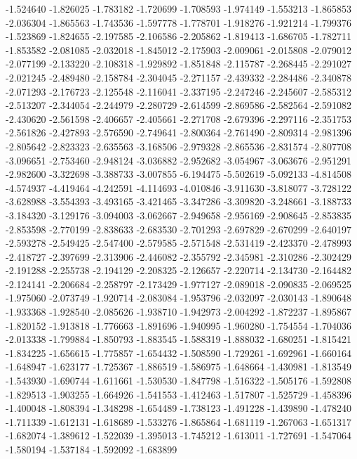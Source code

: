 -1.524640
-1.826025
-1.783182
-1.720699
-1.708593
-1.974149
-1.553213
-1.865853
-2.036304
-1.865563
-1.743536
-1.597778
-1.778701
-1.918276
-1.921214
-1.799376
-1.523869
-1.824655
-2.197585
-2.106586
-2.205862
-1.819413
-1.686705
-1.782711
-1.853582
-2.081085
-2.032018
-1.845012
-2.175903
-2.009061
-2.015808
-2.079012
-2.077199
-2.133220
-2.108318
-1.929892
-1.851848
-2.115787
-2.268445
-2.291027
-2.021245
-2.489480
-2.158784
-2.304045
-2.271157
-2.439332
-2.284486
-2.340878
-2.071293
-2.176723
-2.125548
-2.116041
-2.337195
-2.247246
-2.245607
-2.585312
-2.513207
-2.344054
-2.244979
-2.280729
-2.614599
-2.869586
-2.582564
-2.591082
-2.430620
-2.561598
-2.406657
-2.405661
-2.271708
-2.679396
-2.297116
-2.351753
-2.561826
-2.427893
-2.576590
-2.749641
-2.800364
-2.761490
-2.809314
-2.981396
-2.805642
-2.823323
-2.635563
-3.168506
-2.979328
-2.865536
-2.831574
-2.807708
-3.096651
-2.753460
-2.948124
-3.036882
-2.952682
-3.054967
-3.063676
-2.951291
-2.982600
-3.322698
-3.388733
-3.007855
-6.194475
-5.502619
-5.092133
-4.814508
-4.574937
-4.419464
-4.242591
-4.114693
-4.010846
-3.911630
-3.818077
-3.728122
-3.628988
-3.554393
-3.493165
-3.421465
-3.347286
-3.309820
-3.248661
-3.188733
-3.184320
-3.129176
-3.094003
-3.062667
-2.949658
-2.956169
-2.908645
-2.853835
-2.853598
-2.770199
-2.838633
-2.683530
-2.701293
-2.697829
-2.670299
-2.640197
-2.593278
-2.549425
-2.547400
-2.579585
-2.571548
-2.531419
-2.423370
-2.478993
-2.418727
-2.397699
-2.313906
-2.446082
-2.355792
-2.345981
-2.310286
-2.302429
-2.191288
-2.255738
-2.194129
-2.208325
-2.126657
-2.220714
-2.134730
-2.164482
-2.124141
-2.206684
-2.258797
-2.173429
-1.977127
-2.089018
-2.090835
-2.069525
-1.975060
-2.073749
-1.920714
-2.083084
-1.953796
-2.032097
-2.030143
-1.890648
-1.933368
-1.928540
-2.085626
-1.938710
-1.942973
-2.004292
-1.872237
-1.895867
-1.820152
-1.913818
-1.776663
-1.891696
-1.940995
-1.960280
-1.754554
-1.704036
-2.013338
-1.799884
-1.850793
-1.883545
-1.588319
-1.888032
-1.680251
-1.815421
-1.834225
-1.656615
-1.775857
-1.654432
-1.508590
-1.729261
-1.692961
-1.660164
-1.648947
-1.623177
-1.725367
-1.886519
-1.586975
-1.648664
-1.430981
-1.813549
-1.543930
-1.690744
-1.611661
-1.530530
-1.847798
-1.516322
-1.505176
-1.592808
-1.829513
-1.903255
-1.664926
-1.541553
-1.412463
-1.517807
-1.525729
-1.458396
-1.400048
-1.808394
-1.348298
-1.654489
-1.738123
-1.491228
-1.439890
-1.478240
-1.711339
-1.612131
-1.618689
-1.533276
-1.865864
-1.681119
-1.267063
-1.651317
-1.682074
-1.389612
-1.522039
-1.395013
-1.745212
-1.613011
-1.727691
-1.547064
-1.580194
-1.537184
-1.592092
-1.683899
